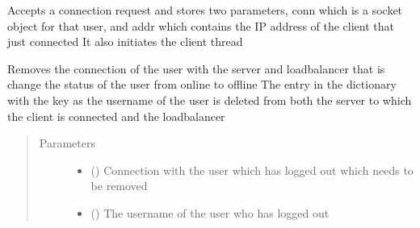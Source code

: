 \documentclass[letterpaper,10pt,english]{sphinxmanual}
\begin{document}

\begin{fulllineitems}
\label{\detokenize{server:server.main}}
\sphinxAtStartPar
Accepts a connection request and stores two parameters,
conn which is a socket object for that user, and addr
which contains the IP address of the client that just
connected
It also initiates the client thread

\end{fulllineitems}


\begin{fulllineitems}
\label{\detokenize{server:server.remove}}
\sphinxAtStartPar
Removes the connection of the user with the server and loadbalancer that is change the status of the user from online to offline
The entry in the dictionary with the key as the username of the user is deleted from both the server to which the client is connected and the loadbalancer
\begin{quote}\begin{description}
\item[{Parameters}] \leavevmode\begin{itemize}
\item {} 
\sphinxAtStartPar
{} () \textendash{} Connection with the user which has logged out which needs to be removed

\item {} 
\sphinxAtStartPar
{} () \textendash{} The username of the user who has logged out

\end{itemize}

\end{description}\end{quote}

\end{fulllineitems}
\end{document}
